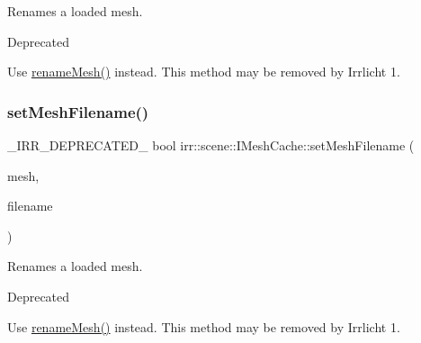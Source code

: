 Renames a loaded mesh. 

\begin{DoxyRefDesc}{Deprecated}
\item[\hyperlink{deprecated__deprecated000038}{Deprecated}]Use \hyperlink{classirr_1_1scene_1_1IMeshCache_a820743b703cdc4362a3dbe6664271bcb}{rename\+Mesh()} instead. This method may be removed by Irrlicht 1. \end{DoxyRefDesc}
\mbox{\label{classirr_1_1scene_1_1IMeshCache_a9b7770a23859ddd045b3c22dfbecbcaf}} 
\subsubsection{\texorpdfstring{set\+Mesh\+Filename()}{setMeshFilename()}\hspace{0.1cm}{\footnotesize\ttfamily [3/4]}}
{\footnotesize\ttfamily \+\_\+\+I\+R\+R\+\_\+\+D\+E\+P\+R\+E\+C\+A\+T\+E\+D\+\_\+ bool irr\+::scene\+::\+I\+Mesh\+Cache\+::set\+Mesh\+Filename (\begin{DoxyParamCaption}\item[{const \hyperlink{classirr_1_1scene_1_1IMesh}{I\+Mesh} $\ast$const}]{mesh,  }\item[{const \hyperlink{namespaceirr_1_1io_a6468281622ce3a1c46b72e19f32dded5}{io\+::path} \&}]{filename }\end{DoxyParamCaption})\hspace{0.3cm}{\ttfamily [inline]}}



Renames a loaded mesh. 

\begin{DoxyRefDesc}{Deprecated}
\item[\hyperlink{deprecated__deprecated000013}{Deprecated}]Use \hyperlink{classirr_1_1scene_1_1IMeshCache_a820743b703cdc4362a3dbe6664271bcb}{rename\+Mesh()} instead. This method may be removed by Irrlicht 1. \end{DoxyRefDesc}
\mbox{\label{classirr_1_1scene_1_1IMeshCache_a9b7770a23859ddd045b3c22dfbecbcaf}} 
